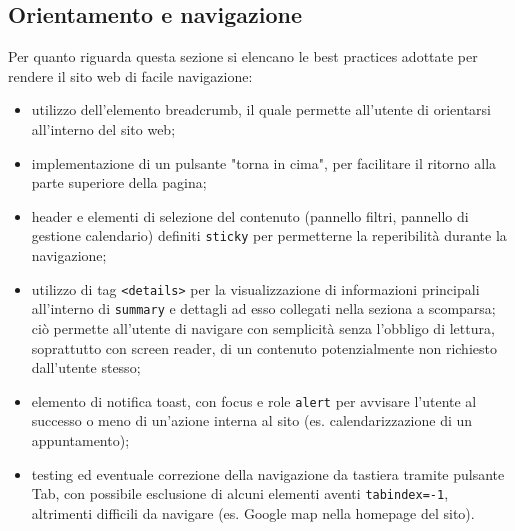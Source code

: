 \documentclass[a4paper,10pt]{article}
\begin{document}
	\subsection{Orientamento e navigazione}
	Per quanto riguarda questa sezione si elencano le best practices adottate per rendere il sito web di facile navigazione:
	\begin{itemize}
		\item utilizzo dell'elemento breadcrumb, il quale permette all'utente di orientarsi all'interno del sito web;
		\item implementazione di un pulsante "torna in cima", per facilitare il ritorno alla parte superiore della pagina;
		\item header e elementi di selezione del contenuto (pannello filtri, pannello di gestione calendario) definiti \texttt{sticky} per permetterne la reperibilità durante la navigazione;
		\item utilizzo di tag \texttt{<details>} per la visualizzazione di informazioni principali all'interno di \texttt{summary} e dettagli ad esso collegati nella seziona a scomparsa; ciò permette all'utente di navigare con semplicità senza l'obbligo di lettura, soprattutto con screen reader, di un contenuto potenzialmente non richiesto dall'utente stesso;
		\item elemento di notifica toast, con focus e role \texttt{alert} per avvisare l'utente al successo o meno di un'azione interna al sito (es. calendarizzazione di un appuntamento);
		\item testing ed eventuale correzione della navigazione da tastiera tramite pulsante Tab, con possibile esclusione di alcuni elementi aventi \texttt{tabindex=-1}, altrimenti difficili da navigare (es. Google map nella homepage del sito).
	\end{itemize}
\end{document}
